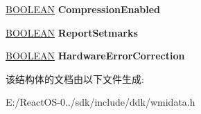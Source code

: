 \begin{DoxyCompactItemize}
\hyperlink{_processor_bind_8h_a112e3146cb38b6ee95e64d85842e380a}{B\+O\+O\+L\+E\+AN} {\bfseries Compression\+Enabled}
\item 
\mbox{\label{struct___w_m_i___t_a_p_e___d_r_i_v_e___p_a_r_a_m_e_t_e_r_s_a77fd1ff00e677785eaf886790638bed9}} 
\hyperlink{_processor_bind_8h_a112e3146cb38b6ee95e64d85842e380a}{B\+O\+O\+L\+E\+AN} {\bfseries Report\+Setmarks}
\item 
\mbox{\label{struct___w_m_i___t_a_p_e___d_r_i_v_e___p_a_r_a_m_e_t_e_r_s_a5b796a5884909111b5b8306857769c15}} 
\hyperlink{_processor_bind_8h_a112e3146cb38b6ee95e64d85842e380a}{B\+O\+O\+L\+E\+AN} {\bfseries Hardware\+Error\+Correction}
\end{DoxyCompactItemize}


该结构体的文档由以下文件生成\+:\begin{DoxyCompactItemize}
\item 
E\+:/\+React\+O\+S-\/0../sdk/include/ddk/wmidata.\+h\end{DoxyCompactItemize}
